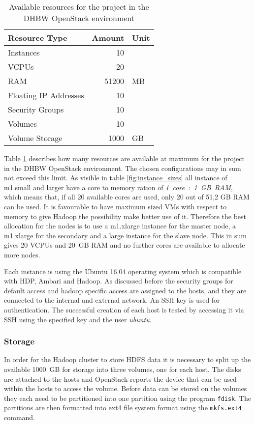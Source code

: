 \begin{table}[hbt]
\centering
	\begin{tabular}{lrl}
	  Resource Type & Amount & Unit\\
	  \hline
	  Instances & 10 & \\
	  \acp{VCPU} & 20 & \\
	  \acs{RAM} & 51200 & \acs{MB} \\
	  Floating \acs{IP} Addresses & 10 & \\
	  Security Groups & 10 & \\
	  Volumes & 10 & \\
	  Volume Storage & 1000 & \acs{GB}
	\end{tabular}
	\caption{Available resources for the project in the \ac{DHBW} OpenStack environment}
	\label{fig:resources_openstack}
\end{table}

Table \ref{fig:resources_openstack} describes how many resources are available at maximum for the project in the \ac{DHBW} OpenStack environment. The chosen configurations may in sum not exceed this limit.
As visible in table \ref{fig:instance_sizes} all instance of m1.small and larger have a core to memory ration of \emph{1~core~:~1~GB~RAM}, which means that, if all 20 available cores are used, only 20 out of 51,2 GB RAM  can be used. It is favourable to have maximum sized \acp{VM} with respect to memory to give Hadoop the possibility make better use of it.
Therefore the best allocation for the nodes is to use a m1.xlarge instance for the master node, a m1.xlarge for the secondary and a large instance for the slave node.
This in sum gives 20 \acp{VCPU} and 20~\ac{GB} \ac{RAM} and no further cores are available to allocate more nodes.


Each instance is using the Ubuntu 16.04 operating system which is compatible with \ac{HDP}, Ambari and Hadoop. As discussed before the security groups for default access and hadoop specific access are assigned to the hosts, and they are connected to the internal and external network. An \ac{SSH} key is used for authentication.
The successful creation of each host is tested by accessing it via \ac{SSH} using the specified key and the user \emph{ubuntu}.


\subsubsection{Storage}

In order for the Hadoop cluster to store \ac{HDFS} data it is necessary to split up the available 1000~\ac{GB} for storage into three volumes, one for each host.
The disks are attached to the hosts and OpenStack reports the device that can be 
used within the hosts to access the volume.
Before data can be stored on the volumes they each need to be partitioned into one partition using the program \texttt{fdisk}. The partitions are then formatted into ext4 file system format using the \texttt{mkfs.ext4} command.


